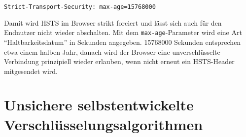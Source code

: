 \documentclass[a4paper,12bpt]{scrartcl}
\begin{document}
\begin{enumerate}
        \begin{lstlisting}
Strict-Transport-Security: max-age=15768000
        \end{lstlisting}

        Damit wird HSTS im Browser strikt forciert und lässt sich auch für
        den Endnutzer nicht wieder abschalten.
        Mit dem \texttt{max-age}-Parameter wird eine Art ``Haltbarkeitsdatum''
        in Sekunden angegeben. 15768000 Sekunden entsprechen etwa einem halben
        Jahr, danach wird der Browser eine unverschlüsselte Verbindung prinzipiell
        wieder erlauben, wenn nicht erneut ein HSTS-Header mitgesendet wird.
\end{enumerate}

\section{Unsichere selbstentwickelte Verschlüsselungsalgorithmen}
\label{sec:crypto}

\begin{appendices}
\end{appendices}
\end{document}
